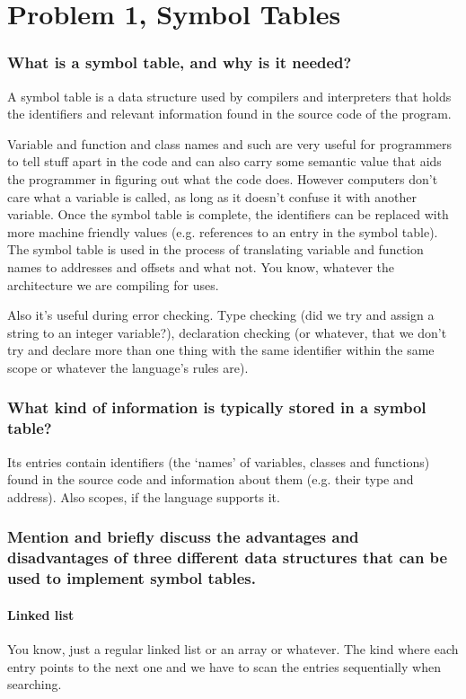 
\section{Problem 1, Symbol Tables}
\subsubsection{What is a symbol table, and why is it needed?}
A symbol table is a data structure used by compilers and interpreters that holds the identifiers and relevant information found in the source code of the program.

Variable and function and class names and such are very useful for programmers to tell stuff apart in the code and can also carry some semantic value that aids the programmer in figuring out what the code does.
However computers don't care what a variable is called, as long as it doesn't confuse it with another variable.
Once the symbol table is complete, the identifiers can be replaced with more machine friendly values (e.g. references to an entry in the symbol table).
The symbol table is used in the process of translating variable and function names to addresses and offsets and what not.
You know, whatever the architecture we are compiling for uses.

Also it's useful during error checking.
Type checking (did we try and assign a string to an integer variable?), declaration checking (or whatever, that we don't try and declare more than one thing with the same identifier within the same scope or whatever the language's rules are).


\subsubsection{What kind of information is typically stored in a symbol table?}
Its entries contain identifiers (the `names' of variables, classes and functions) found in the source code and information about them (e.g. their type and address).
Also scopes, if the language supports it.

\subsubsection{Mention and briefly discuss the advantages and disadvantages of three different data structures that can be used to implement symbol tables.}
\paragraph{Linked list}
You know, just a regular linked list or an array or whatever.
The kind where each entry points to the next one and we have to scan the entries sequentially when searching.

